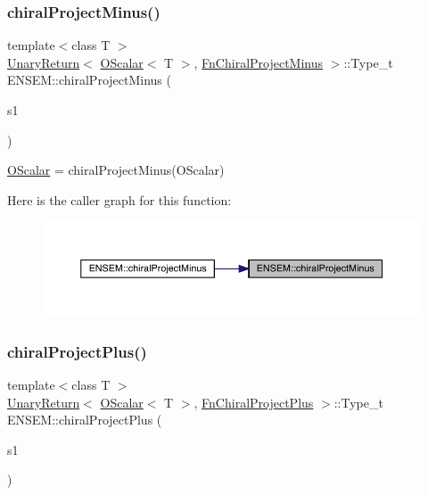 \subsubsection{\texorpdfstring{chiralProjectMinus()}{chiralProjectMinus()}}
{\footnotesize\ttfamily template$<$class T $>$ \\
\mbox{\hyperlink{structENSEM_1_1UnaryReturn}{Unary\+Return}}$<$ \mbox{\hyperlink{classENSEM_1_1OScalar}{O\+Scalar}}$<$ T $>$, \mbox{\hyperlink{structENSEM_1_1FnChiralProjectMinus}{Fn\+Chiral\+Project\+Minus}} $>$\+::Type\+\_\+t E\+N\+S\+E\+M\+::chiral\+Project\+Minus (\begin{DoxyParamCaption}\item[{const \mbox{\hyperlink{classENSEM_1_1OScalar}{O\+Scalar}}$<$ T $>$ \&}]{s1 }\end{DoxyParamCaption})\hspace{0.3cm}{\ttfamily [inline]}}



\mbox{\hyperlink{classENSEM_1_1OScalar}{O\+Scalar}} = chiral\+Project\+Minus(\+O\+Scalar) 

Here is the caller graph for this function\+:\nopagebreak
\begin{figure}[H]
\begin{center}
\leavevmode
\includegraphics[width=350pt]{d1/d71/group__obsscalar_ga53162d32552af7a67c288bfa204dce7c_icgraph}
\end{center}
\end{figure}
\mbox{\label{group__obsscalar_gad83dc4f2cde27e1d12f3eb6eb672bf87}} 
\subsubsection{\texorpdfstring{chiralProjectPlus()}{chiralProjectPlus()}}
{\footnotesize\ttfamily template$<$class T $>$ \\
\mbox{\hyperlink{structENSEM_1_1UnaryReturn}{Unary\+Return}}$<$ \mbox{\hyperlink{classENSEM_1_1OScalar}{O\+Scalar}}$<$ T $>$, \mbox{\hyperlink{structENSEM_1_1FnChiralProjectPlus}{Fn\+Chiral\+Project\+Plus}} $>$\+::Type\+\_\+t E\+N\+S\+E\+M\+::chiral\+Project\+Plus (\begin{DoxyParamCaption}\item[{const \mbox{\hyperlink{classENSEM_1_1OScalar}{O\+Scalar}}$<$ T $>$ \&}]{s1 }\end{DoxyParamCaption})\hspace{0.3cm}{\ttfamily [inline]}}



